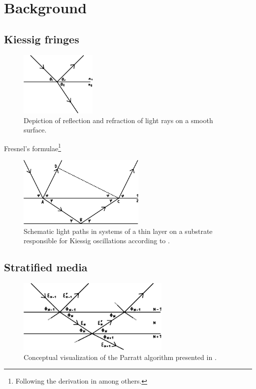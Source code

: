 \section{Background}


\cite{xray}


\subsection{Kiessig fringes}

\begin{figure}
	\centering
	\includegraphics[width=0.33\textwidth]{content/graphics/fresnel.pdf}
	\caption{Depiction of reflection and refraction of light rays on a smooth surface.}
	\label{fig:fresnel}
\end{figure}

Fresnel's formulae\footnote{Following the derivation in \cite{McMorrow_2011} among others.}

\cite{Kiessig_1931}

\begin{figure}
	\centering
	\includegraphics[width=0.55\textwidth]{content/graphics/kiessig.pdf}
	\caption{Schematic light paths in systems of a thin layer on a substrate responsible for Kiessig oscillations according to \cite{Kiessig_1931}.}
	\label{fig:kiessig}
\end{figure}


\subsection{Stratified media}

\cite{Parratt_1954}

\begin{figure}
	\centering
	\includegraphics[width=0.66\textwidth]{content/graphics/parratt.pdf}
	\caption{Conceptual visualization of the Parratt algorithm presented in \cite{Parratt_1954}.}
	\label{fig:parratt}
\end{figure}
